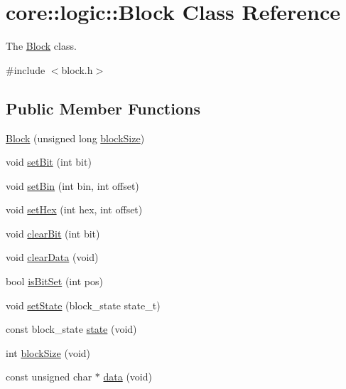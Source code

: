 \hypertarget{classcore_1_1logic_1_1_block}{}\section{core\+:\+:logic\+:\+:Block Class Reference}
\label{classcore_1_1logic_1_1_block}


The \mbox{\hyperlink{classcore_1_1logic_1_1_block}{Block}} class.  




{\ttfamily \#include $<$block.\+h$>$}

\subsection*{Public Member Functions}
\begin{DoxyCompactItemize}
\item 
\mbox{\hyperlink{classcore_1_1logic_1_1_block_a893088c60b4c0c41370eb5df87b566d0}{Block}} (unsigned long \mbox{\hyperlink{classcore_1_1logic_1_1_block_a0b57337ab5b3817a6509efd1a323c3eb}{block\+Size}})
\item 
void \mbox{\hyperlink{classcore_1_1logic_1_1_block_acb19637acf2ec89d7d9fde9b40b3cd29}{set\+Bit}} (int bit)
\item 
void \mbox{\hyperlink{classcore_1_1logic_1_1_block_a9f25c077733b21120df01e5174a8dfc7}{set\+Bin}} (int bin, int offset)
\item 
void \mbox{\hyperlink{classcore_1_1logic_1_1_block_ab7c61557660651b8afb417ac6fff8418}{set\+Hex}} (int hex, int offset)
\item 
void \mbox{\hyperlink{classcore_1_1logic_1_1_block_aaf20f779418e0491c626e009f1e66bb9}{clear\+Bit}} (int bit)
\item 
void \mbox{\hyperlink{classcore_1_1logic_1_1_block_aa63e9635221bda7c6660a5c254510e78}{clear\+Data}} (void)
\item 
bool \mbox{\hyperlink{classcore_1_1logic_1_1_block_a0130b21b567a1149edcc02c48ccc52ef}{is\+Bit\+Set}} (int pos)
\item 
void \mbox{\hyperlink{classcore_1_1logic_1_1_block_a2568d052f60f1c8fb59cc099bb8ba12b}{set\+State}} (block\+\_\+state state\+\_\+t)
\item 
const block\+\_\+state \mbox{\hyperlink{classcore_1_1logic_1_1_block_a0a84f5b5c790173d5f3ed4db2f33535b}{state}} (void)
\item 
int \mbox{\hyperlink{classcore_1_1logic_1_1_block_a0b57337ab5b3817a6509efd1a323c3eb}{block\+Size}} (void)
\item 
const unsigned char $\ast$ \mbox{\hyperlink{classcore_1_1logic_1_1_block_a2c8b08fd7d36f82b34b7d89268f2da4f}{data}} (void)
\end{DoxyCompactItemize}
